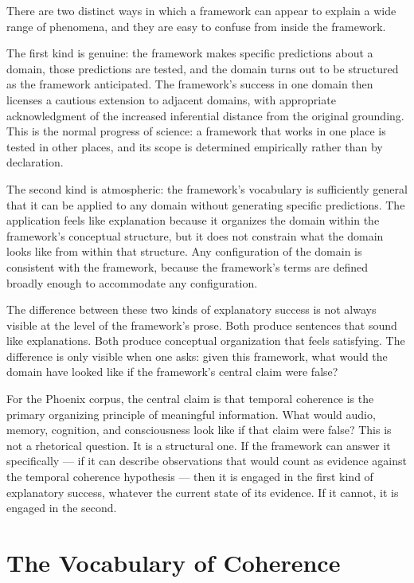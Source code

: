 There are two distinct ways in which a framework can appear
to explain a wide range of phenomena, and they are easy
to confuse from inside the framework.

The first kind is genuine: the framework makes specific
predictions about a domain, those predictions are tested,
and the domain turns out to be structured as the framework
anticipated. The framework's success in one domain then
licenses a cautious extension to adjacent domains, with
appropriate acknowledgment of the increased inferential
distance from the original grounding. This is the normal
progress of science: a framework that works in one place
is tested in other places, and its scope is determined
empirically rather than by declaration.

The second kind is atmospheric: the framework's vocabulary
is sufficiently general that it can be applied to any domain
without generating specific predictions. The application
feels like explanation because it organizes the domain
within the framework's conceptual structure, but it does not
constrain what the domain looks like from within that
structure. Any configuration of the domain is consistent
with the framework, because the framework's terms are defined
broadly enough to accommodate any configuration.

The difference between these two kinds of explanatory success
is not always visible at the level of the framework's
prose. Both produce sentences that sound like explanations.
Both produce conceptual organization that feels satisfying.
The difference is only visible when one asks: given this
framework, what would the domain have looked like if the
framework's central claim were false?

For the Phoenix corpus, the central claim is that temporal
coherence is the primary organizing principle of meaningful
information. What would audio, memory, cognition, and
consciousness look like if that claim were false? This is
not a rhetorical question. It is a structural one. If the
framework can answer it specifically --- if it can describe
observations that would count as evidence against the temporal
coherence hypothesis --- then it is engaged in the first
kind of explanatory success, whatever the current state
of its evidence. If it cannot, it is engaged in the second.

\section{The Vocabulary of Coherence}
\label{sec:vocabulary-coherence}

